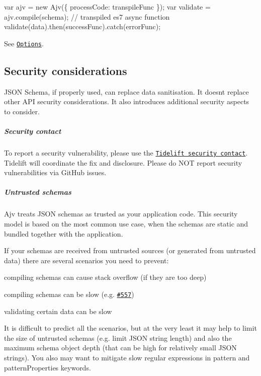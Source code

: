 \begin{DoxyCode}
var ajv = new Ajv(\{ processCode: transpileFunc \});
var validate = ajv.compile(schema); // transpiled es7 async function
validate(data).then(successFunc).catch(errorFunc);
\end{DoxyCode}


See \href{#options}{\tt Options}.

\subsection*{Security considerations}

J\+S\+ON Schema, if properly used, can replace data sanitisation. It doesn\textquotesingle{}t replace other A\+PI security considerations. It also introduces additional security aspects to consider.

\subparagraph*{Security contact}

To report a security vulnerability, please use the \href{https://tidelift.com/security}{\tt Tidelift security contact}. Tidelift will coordinate the fix and disclosure. Please do N\+OT report security vulnerabilities via Git\+Hub issues.

\subparagraph*{Untrusted schemas}

Ajv treats J\+S\+ON schemas as trusted as your application code. This security model is based on the most common use case, when the schemas are static and bundled together with the application.

If your schemas are received from untrusted sources (or generated from untrusted data) there are several scenarios you need to prevent\+:
\begin{DoxyItemize}
\item compiling schemas can cause stack overflow (if they are too deep)
\item compiling schemas can be slow (e.\+g. \href{https://github.com/epoberezkin/ajv/issues/557}{\tt \#557})
\item validating certain data can be slow
\end{DoxyItemize}

It is difficult to predict all the scenarios, but at the very least it may help to limit the size of untrusted schemas (e.\+g. limit J\+S\+ON string length) and also the maximum schema object depth (that can be high for relatively small J\+S\+ON strings). You also may want to mitigate slow regular expressions in {\ttfamily pattern} and {\ttfamily pattern\+Properties} keywords.

